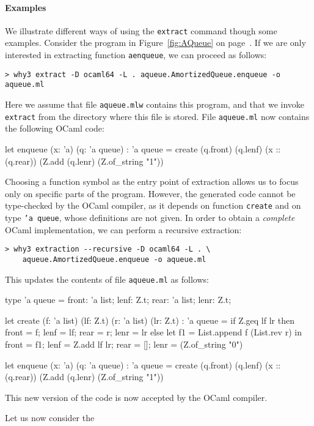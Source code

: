 \paragraph{Examples}
We illustrate different ways of using the \texttt{extract} command though some
examples. Consider the program in Figure~\ref{fig:AQueue} on
page~\pageref{fig:AQueue}. If we are only interested in extracting function
\texttt{aenqueue}, we can proceed as follows:
\begin{verbatim}
> why3 extract -D ocaml64 -L . aqueue.AmortizedQueue.enqueue -o aqueue.ml
\end{verbatim}
Here we assume that file \texttt{aqueue.mlw} contains this program, and that
we invoke \texttt{extract} from the directory where this file is stored. File
\texttt{aqueue.ml} now contains the following OCaml code:
\begin{whycode}
let enqueue (x: 'a) (q: 'a queue) : 'a queue =
  create (q.front) (q.lenf) (x :: (q.rear))
    (Z.add (q.lenr) (Z.of_string "1"))
\end{whycode}
Choosing a function symbol as the entry point of extraction allows us to focus
only on specific parts of the program. However, the generated code cannot be
type-checked by the OCaml compiler, as it depends on function \texttt{create}
and on type \texttt{'a queue}, whose definitions are not given. In order to
obtain a \emph{complete} OCaml implementation, we can perform a recursive
extraction:
\begin{verbatim}
> why3 extraction --recursive -D ocaml64 -L . \
    aqueue.AmortizedQueue.enqueue -o aqueue.ml
\end{verbatim}
This updates the contents of file \texttt{aqueue.ml} as follows:
\begin{whycode}
type 'a queue = {
  front: 'a list;
  lenf: Z.t;
  rear: 'a list;
  lenr: Z.t;
  }

let create (f: 'a list) (lf: Z.t) (r: 'a list) (lr: Z.t) : 'a queue =
  if Z.geq lf lr
  then
    { front = f; lenf = lf; rear = r; lenr = lr }
  else
    let f1 = List.append f (List.rev r) in
    { front = f1; lenf = Z.add lf lr; rear = []; lenr = (Z.of_string "0") }

let enqueue (x: 'a) (q: 'a queue) : 'a queue =
  create (q.front) (q.lenf) (x :: (q.rear))
    (Z.add (q.lenr) (Z.of_string "1"))
\end{whycode}
This new version of the code is now accepted by the OCaml compiler.

Let us now consider the

